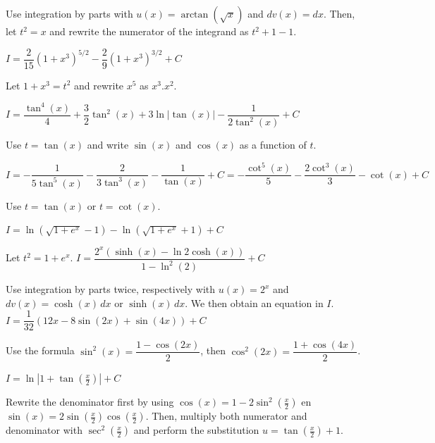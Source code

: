 \begin{Answer}
    	Use integration by parts with $u(x)=\arctan (\sqrt{x})$ and $dv(x)= dx$. Then, let  $t^2={x}$ and rewrite the numerator of the  integrand as $t^2+1-1$. 
    		
    	\Question $I = \dfrac{2}{15} (1+x^3)^{5/2} - \dfrac{2}{9} (1+x^3)^{3/2} + C$
    	 
    	 Let $1+x^3 = t^2$ and rewrite $x^5$ as $x^3.x^2$.
    		
    	\Question $I = \dfrac{\tan^4 (x)}{4}+\dfrac{3}{2}\tan^2 (x) + 3\ln|\tan (x)|-\dfrac{1}{2\tan^2 (x)}+C$
    	
    	Use $t=\tan (x)$ and write $\sin (x)$ and $\cos (x)$ as a function of $t$.
    		
    	\Question $I = -\dfrac{1}{5\tan^5 (x)}-\dfrac{2}{3\tan^3 (x)}-\dfrac{1}{\tan (x)} + C = -\dfrac{\cot^5 (x)}{5}-\dfrac{2\cot^3 (x)}{3}-\cot (x) + C$
    	
    	Use $t=\tan (x)$ or $t=\cot (x)$.
    		
    	\Question $I = \ln\left(\sqrt{1+e^x}-1\right) - \ln\left(\sqrt{1+e^x}+1\right) + C$
    	
    	Let $t^2 = 1 + e^x$.
        \ifanalysis
    	\Question $I = \dfrac{2^x\left(\sinh (x) -\ln 2 \cosh (x)\right)}{1-\ln^2 (2)}+C$
    	
    	Use integration by parts twice, respectively with $u(x)=2^x$ and $dv(x)= \cosh (x)\, dx$ or $\sinh (x)\, dx $. We then obtain an equation in $I$.
        \fi
    	\Question $I= \dfrac{1}{32} (12x - 8 \sin (2x) + \sin (4x)) + C $
    	
    	Use the formula $\sin^2(x) = \dfrac{1-\cos(2x)}{2}$, then $\cos^2(2x) = \dfrac{1+\cos(4x)}{2}$.
    	
    	\Question $ I=\ln \left| 1 + \tan \left( \frac{x}{2} \right) \right| + C $
    	
    	Rewrite the denominator first by using  $\cos(x)= 1-2\sin^2 \left(\frac{x}{2} \right)$ en \\ $\sin (x)= 2 \sin \left(\frac{x}{2} \right) \cos \left(\frac{x}{2} \right)$. Then, multiply both numerator and denominator with $\sec^2 \left(\frac{x}{2} \right)$ and perform the substitution $u = \tan \left(\frac{x}{2} \right) + 1$.
\end{Answer}


\ifcalculus \pagebreak \fi
